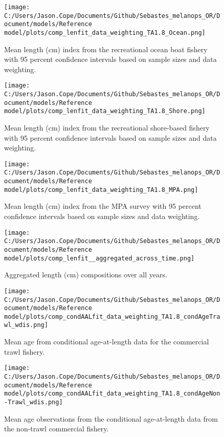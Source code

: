 \documentclass[11pt,
  english,
  letterpaper,
]{article}
\begin{document}
\begin{figure}
\centering
\texttt{[image: C:/Users/Jason.Cope/Documents/Github/Sebastes\_melanops\_OR/Document/models/Reference model/plots/comp\_lenfit\_data\_weighting\_TA1.8\_Ocean.png]}
\caption{Mean length (cm) index from the recreational ocean boat fishery with 95 percent confidence intervals based on sample sizes and data weighting.\label{fig:ocean-mean-len-fit}}
\end{figure}

\begin{figure}
\centering
\texttt{[image: C:/Users/Jason.Cope/Documents/Github/Sebastes\_melanops\_OR/Document/models/Reference model/plots/comp\_lenfit\_data\_weighting\_TA1.8\_Shore.png]}
\caption{Mean length (cm) index from the recreational shore-based fishery with 95 percent confidence intervals based on sample sizes and data weighting.\label{fig:shore-mean-len-fit}}
\end{figure}

\begin{figure}
\centering
\texttt{[image: C:/Users/Jason.Cope/Documents/Github/Sebastes\_melanops\_OR/Document/models/Reference model/plots/comp\_lenfit\_data\_weighting\_TA1.8\_MPA.png]}
\caption{Mean length (cm) index from the MPA survey with 95 percent confidence intervals based on sample sizes and data weighting.\label{fig:mpa-mean-len-fit}}
\end{figure}

\begin{figure}
\centering
\texttt{[image: C:/Users/Jason.Cope/Documents/Github/Sebastes\_melanops\_OR/Document/models/Reference model/plots/comp\_lenfit\_\_aggregated\_across\_time.png]}
\caption{Aggregated length (cm) compositions over all years.\label{fig:agg-len-fit}}
\end{figure}

\begin{figure}
\centering
\texttt{[image: C:/Users/Jason.Cope/Documents/Github/Sebastes\_melanops\_OR/Document/models/Reference model/plots/comp\_condAALfit\_data\_weighting\_TA1.8\_condAgeTrawl\_wdis.png]}
\caption{Mean age from conditional age-at-length data for the commercial trawl fishery.\label{fig:trawl-mean-caal}}
\end{figure}

\begin{figure}
\centering
\texttt{[image: C:/Users/Jason.Cope/Documents/Github/Sebastes\_melanops\_OR/Document/models/Reference model/plots/comp\_condAALfit\_data\_weighting\_TA1.8\_condAgeNon-Trawl\_wdis.png]}
\caption{Mean age observations from the conditional age-at-length data from the non-trawl commercial fishery.\label{fig:nontrawl-mean-caal}}
\end{figure}
\end{document}
